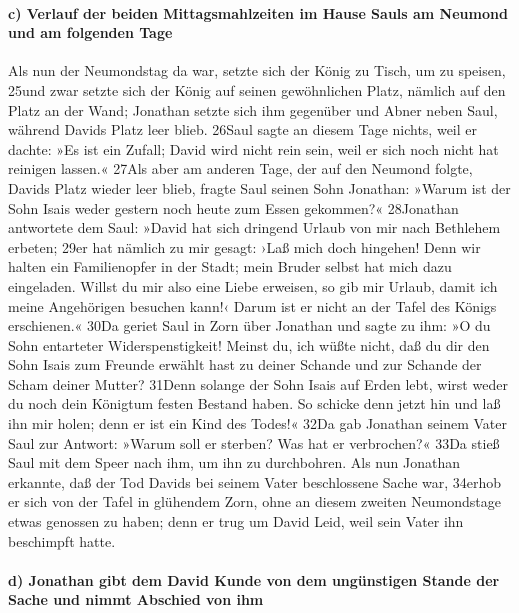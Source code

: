 \hypertarget{c-verlauf-der-beiden-mittagsmahlzeiten-im-hause-sauls-am-neumond-und-am-folgenden-tage}{%
\paragraph{c) Verlauf der beiden Mittagsmahlzeiten im Hause Sauls am
Neumond und am folgenden
Tage}\label{c-verlauf-der-beiden-mittagsmahlzeiten-im-hause-sauls-am-neumond-und-am-folgenden-tage}}

Als nun der Neumondstag da war, setzte sich der König zu Tisch, um zu
speisen, 25und zwar setzte sich der König auf seinen gewöhnlichen Platz,
nämlich auf den Platz an der Wand; Jonathan setzte sich ihm gegenüber
und Abner neben Saul, während Davids Platz leer blieb. 26Saul sagte an
diesem Tage nichts, weil er dachte: »Es ist ein Zufall; David wird nicht
rein sein, weil er sich noch nicht hat reinigen lassen.« 27Als aber am
anderen Tage, der auf den Neumond folgte, Davids Platz wieder leer
blieb, fragte Saul seinen Sohn Jonathan: »Warum ist der Sohn Isais weder
gestern noch heute zum Essen gekommen?« 28Jonathan antwortete dem Saul:
»David hat sich dringend Urlaub von mir nach Bethlehem erbeten; 29er hat
nämlich zu mir gesagt: ›Laß mich doch hingehen! Denn wir halten ein
Familienopfer in der Stadt; mein Bruder selbst hat mich dazu eingeladen.
Willst du mir also eine Liebe erweisen, so gib mir Urlaub, damit ich
meine Angehörigen besuchen kann!‹ Darum ist er nicht an der Tafel des
Königs erschienen.« 30Da geriet Saul in Zorn über Jonathan und sagte zu
ihm: »O du Sohn entarteter Widerspenstigkeit! Meinst du, ich wüßte
nicht, daß du dir den Sohn Isais zum Freunde erwählt hast zu deiner
Schande und zur Schande der Scham deiner Mutter? 31Denn solange der Sohn
Isais auf Erden lebt, wirst weder du noch dein Königtum festen Bestand
haben. So schicke denn jetzt hin und laß ihn mir holen; denn er ist ein
Kind des Todes!« 32Da gab Jonathan seinem Vater Saul zur Antwort: »Warum
soll er sterben? Was hat er verbrochen?« 33Da stieß Saul mit dem Speer
nach ihm, um ihn zu durchbohren. Als nun Jonathan erkannte, daß der Tod
Davids bei seinem Vater beschlossene Sache war, 34erhob er sich von der
Tafel in glühendem Zorn, ohne an diesem zweiten Neumondstage etwas
genossen zu haben; denn er trug um David Leid, weil sein Vater ihn
beschimpft hatte.

\hypertarget{d-jonathan-gibt-dem-david-kunde-von-dem-unguxfcnstigen-stande-der-sache-und-nimmt-abschied-von-ihm}{%
\paragraph{d) Jonathan gibt dem David Kunde von dem ungünstigen Stande
der Sache und nimmt Abschied von
ihm}\label{d-jonathan-gibt-dem-david-kunde-von-dem-unguxfcnstigen-stande-der-sache-und-nimmt-abschied-von-ihm}}

